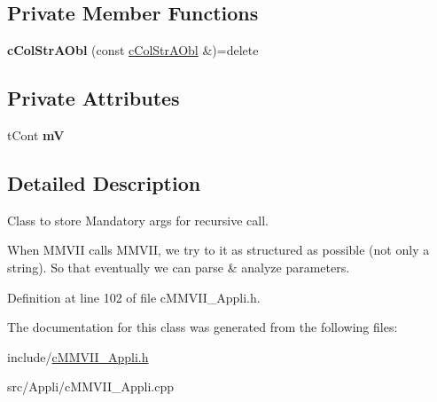 \subsection*{Private Member Functions}
\begin{DoxyCompactItemize}
\item 
{\bfseries c\+Col\+Str\+A\+Obl} (const \hyperlink{classMMVII_1_1cColStrAObl}{c\+Col\+Str\+A\+Obl} \&)=delete\hypertarget{classMMVII_1_1cColStrAObl_a443578344596585d74ca6a0700bdb8b3}{}\label{classMMVII_1_1cColStrAObl_a443578344596585d74ca6a0700bdb8b3}

\end{DoxyCompactItemize}
\subsection*{Private Attributes}
\begin{DoxyCompactItemize}
\item 
t\+Cont {\bfseries mV}\hypertarget{classMMVII_1_1cColStrAObl_ab441b87d8b91c9a4a08f440c780570c2}{}\label{classMMVII_1_1cColStrAObl_ab441b87d8b91c9a4a08f440c780570c2}

\end{DoxyCompactItemize}


\subsection{Detailed Description}
Class to store Mandatory args for recursive call. 

When M\+M\+V\+II calls M\+M\+V\+II, we try to it as structured as possible (not only a string). So that eventually we can parse \& analyze parameters. 

Definition at line 102 of file c\+M\+M\+V\+I\+I\+\_\+\+Appli.\+h.



The documentation for this class was generated from the following files\+:\begin{DoxyCompactItemize}
\item 
include/\hyperlink{cMMVII__Appli_8h}{c\+M\+M\+V\+I\+I\+\_\+\+Appli.\+h}\item 
src/\+Appli/c\+M\+M\+V\+I\+I\+\_\+\+Appli.\+cpp\end{DoxyCompactItemize}
